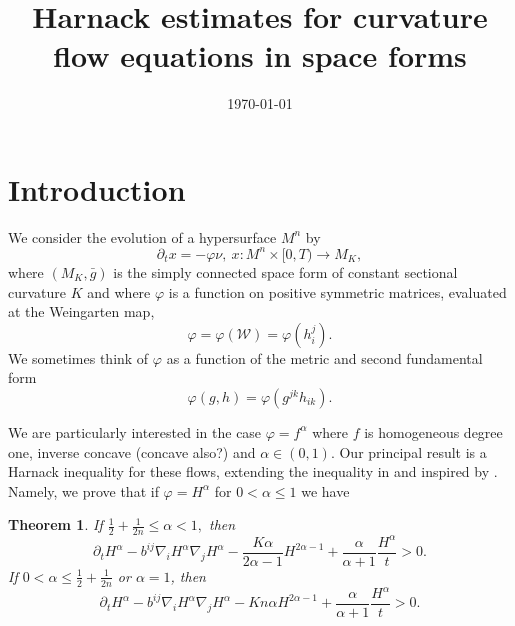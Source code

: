 \documentclass{amsart}
\newtheorem{theorem}{Theorem}
\theoremstyle{definition}
\theoremstyle{remark}
\numberwithin{equation}{section}
\begin{document}
\title[]
 {Harnack estimates for curvature flow equations in space forms}

\curraddr{}
\email{}
\date{\today}

\dedicatory{}
\subjclass[2010]{}
\keywords{}

\begin{abstract}
\end{abstract}

\maketitle

\section{Introduction}

We consider the evolution of a hypersurface $M^n$ by
\[
\partial_tx=-\varphi\nu,~ x:M^n\times[0,T)\to M_K,
\]
where \((M_K, \bar{g})\) is the simply connected space form of constant sectional curvature \(K\) and where $\varphi$ is a function on positive symmetric matrices, evaluated at the Weingarten map,
\[
\varphi = \varphi(\mathcal{W}) = \varphi(h^j_i).
\]
We sometimes think of \(\varphi\) as a function of the metric and second fundamental form
\[
\varphi(g, h) = \varphi(g^{jk} h_{ik}).
\]

We are particularly interested in the case \(\varphi = f^{\alpha}\) where \(f\) is homogeneous degree one, inverse concave (concave also?) and \(\alpha \in (0,1)\). Our principal result is a Harnack inequality for these flows, extending the inequality in \cite{2015arXiv150802821B, bryanlouie} and inspired by \cite{MR1316556, MR1100812, MR1296393, MR1480081}. Namely, we prove that if \(\varphi = H^{\alpha}\) for \(0 < \alpha \leq 1\) we have

\begin{theorem}
If $\frac{1}{2}+\frac{1}{2n}\leq {\alpha}< 1,$ then
\[
\partial_tH^{\alpha} - b^{ij}\nabla_iH^{\alpha}\nabla_jH^{\alpha} - \frac{K {\alpha}}{2{\alpha}-1}H^{2{\alpha}-1} + \frac{{\alpha}}{{\alpha}+1} \frac{H^{\alpha}}{t} > 0.
\]
If $0<{\alpha}\leq \frac{1}{2} + \frac{1}{2n}$ or ${\alpha}=1$, then
\[
\partial_tH^{\alpha} - b^{ij}\nabla_iH^{\alpha}\nabla_jH^{\alpha} - K n{\alpha}H^{2{\alpha}-1} + \frac{{\alpha}}{{\alpha}+1} \frac{H^{\alpha}}{t} > 0.
\]
\end{theorem}
\end{document}
